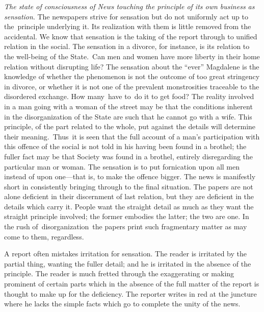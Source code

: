 \documentclass[openany,nobib]{tufte-book}
\begin{document}
\vspace{0.05in}

\emph{The state of consciousness of News touching the principle of its
own business as sensation}. The newspapers strive for sensation but do
not uniformly act up to the~principle underlying it. Its realization
with them is little removed from the accidental. We know that sensation
is the taking of the report through to unified relation in the social.
The sensation in a divorce, for instance, is its relation to the
well-being of the State.~Can men and women have more liberty in their
home relation without disrupting life? The sensation about the ``ever''
Magdalene is the knowledge of whether the phenomenon is not the outcome
of too great stringency in divorce, or whether it is not one of the
prevalent monstrosities traceable to the disordered exchange. How
many~have to~do it to get food? The reality involved in a man going with
a woman of the street may be that the conditions inherent in the
disorganization of the State are such that he cannot go with a wife.
This principle, of the part related to the whole, put against the
details will determine their meaning.~Thus~it is seen that the full
account of a man's participation with this offence of the social is not
told in his having been found in a brothel; the fuller fact may be that
Society was found in a brothel, entirely disregarding the particular man
or woman. The sensation is to put fornication upon all men instead of
upon one---that is, to make the offence bigger. The news is manifestly
short in consistently bringing through to the final situation. The
papers are not alone deficient in their discernment of last relation,
but they are deficient in the details which carry it. People want the
straight detail as much as they want the straight principle involved;
the former embodies the latter; the two are one. In the rush
of~disorganization~the papers print such fragmentary matter as may come
to them, regardless.~

A report often mistakes irritation for sensation. The reader is
irritated by the partial thing, wanting the fuller detail; and he is
irritated in the absence of the principle. The reader is much fretted
through the exaggerating or making prominent of certain parts which in
the absence of the full matter of the report is thought to make up for
the deficiency. The reporter writes in red at the juncture where he
lacks the simple facts which go to complete the unity of the news.~
\end{document}
